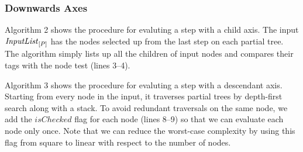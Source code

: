 \subsubsection{Downwards Axes}

Algorithm 2 shows the procedure for evaluting a step with a child axis. The
input $\mathit{InputList}_{[P]}$ has the nodes selected up from the last step on
each partial tree. The algorithm simply lists up all the children of input nodes
and compares their tags with the node test (lines 3--4).

Algorithm 3 shows the procedure for evaluting a step with a descendant axis.
Starting from every node in the input, it traverses partial trees by depth-first
search along with a stack. To avoid redundant traversals on the same node, we
add the $\mathit{isChecked}$ flag for each node (lines 8--9) so that we can
evaluate  each node only once. Note that we can reduce the worst-case complexity
by using this flag from square to linear with respect to the number of nodes.

